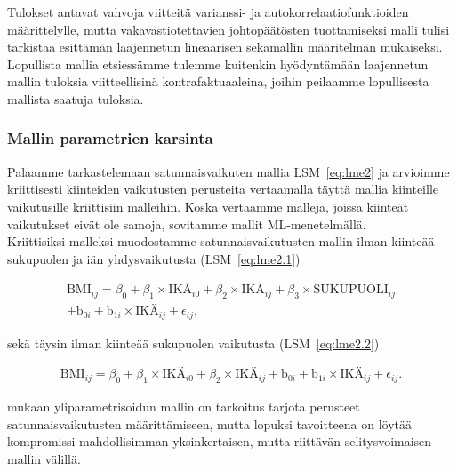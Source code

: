 \documentclass[finnish]{docopts}
\begin{document}
Tulokset antavat vahvoja viitteitä varianssi- ja autokorrelaatiofunktioiden määrittelylle, mutta vakavastiotettavien johtopäätösten tuottamiseksi malli tulisi tarkistaa \cite{pinheiro00} esittämän laajennetun lineaarisen sekamallin määritelmän mukaiseksi.\\

Lopullista mallia etsiessämme tulemme kuitenkin hyödyntämään laajennetun mallin tuloksia viitteellisinä kontrafaktuaaleina, joihin peilaamme lopullisesta mallista saatuja tuloksia.\\

\subsubsection{Mallin parametrien karsinta}
\label{ssb:malliparamkars}

Palaamme tarkastelemaan satunnaisvaikuten mallia LSM~\ref{eq:lme2} ja arvioimme kriittisesti kiinteiden vaikutusten perusteita vertaamalla täyttä mallia kiinteille vaikutusille kriittisiin malleihin. Koska vertaamme malleja, joissa kiinteät vaikutukset eivät ole samoja, sovitamme mallit ML-menetelmällä.\\

Kriittisiksi malleksi muodostamme satunnaisvaikutusten mallin ilman kiinteää sukupuolen ja iän yhdysvaikutusta (LSM~\ref{eq:lme2.1})

\begin{equation}
\begin{split}
 \text{BMI}_{ij} = \beta_0 + \beta_1 \times \text{IKÄ}_{i0} + \beta_2 \times \text{IKÄ}_{ij} + \beta_3 \times \text{SUKUPUOLI}_{ij}\\
 + \text{b}_{0i} + \text{b}_{1i} \times \text{IKÄ}_{ij} + \epsilon_{ij},
\label{eq:lme2.1}
\end{split}
\end{equation}

sekä täysin ilman kiinteää sukupuolen vaikutusta (LSM~\ref{eq:lme2.2})

\begin{equation}
\begin{split}
 \text{BMI}_{ij} = \beta_0 + \beta_1 \times \text{IKÄ}_{i0} + \beta_2 \times \text{IKÄ}_{ij} + \text{b}_{0i} + \text{b}_{1i} \times \text{IKÄ}_{ij} + \epsilon_{ij}.
\label{eq:lme2.2}
\end{split}
\end{equation}

\cite{west14} mukaan yliparametrisoidun mallin on tarkoitus tarjota perusteet satunnaisvaikutusten määrittämiseen, mutta lopuksi tavoitteena on löytää kompromissi mahdollisimman yksinkertaisen, mutta riittävän selitysvoimaisen mallin välillä.
\end{document}
